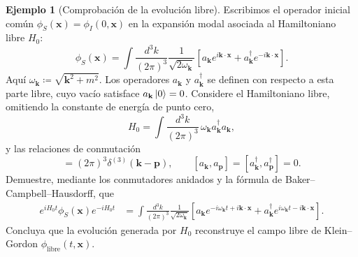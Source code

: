 \documentclass[11pt,letterpaper]{article}
\theoremstyle{definition}
\theoremstyle{definition}
\newtheorem{ejemplo}{Ejemplo}
\begin{document}
\begin{ejemplo}[Comprobación de la evolución libre]
Escribimos el operador inicial común $\phi_S(\mathbf{x})=\phi_I(0,\mathbf{x})$
en la expansión modal asociada al Hamiltoniano libre $H_0$:
\begin{equation}
  \phi_S(\mathbf{x})=
  \int\frac{d^3k}{(2\pi)^3}\frac{1}{\sqrt{2\omega_{\mathbf{k}}}}
  \left[
    a_{\mathbf{k}}e^{i\mathbf{k}\cdot\mathbf{x}}
    +a_{\mathbf{k}}^\dagger e^{-i\mathbf{k}\cdot\mathbf{x}}
  \right].
  \label{eq:freefield0}
\end{equation}
Aquí $\omega_{\mathbf{k}}\coloneqq\sqrt{\mathbf{k}^2+m^2}$.
Los operadores $a_{\mathbf{k}}$ y $a_{\mathbf{k}}^\dagger$ se definen con
respecto a esta parte libre, cuyo vacío satisface $a_{\mathbf{k}}\ket{0}=0$.
Considere el Hamiltoniano libre, omitiendo la constante de energía de punto cero,
\begin{equation}
  H_0=\int\frac{d^3k}{(2\pi)^3}\,
  \omega_{\mathbf{k}}a_{\mathbf{k}}^\dagger a_{\mathbf{k}},
\end{equation}
y las relaciones de conmutación
\begin{equation}
  [a_{\mathbf{k}},a_{\mathbf{p}}^\dagger]
  =(2\pi)^3\delta^{(3)}(\mathbf{k}-\mathbf{p}),
  \qquad
  [a_{\mathbf{k}},a_{\mathbf{p}}]
  =[a_{\mathbf{k}}^\dagger,a_{\mathbf{p}}^\dagger]=0.
\end{equation}
Demuestre, mediante los conmutadores anidados y la fórmula de
Baker--Campbell--Hausdorff, que
\begin{equation}
  \boxed{\begin{aligned}
  e^{iH_0t}\phi_S(\mathbf{x})e^{-iH_0t}
  &={}\int\frac{d^3k}{(2\pi)^3}\frac{1}{\sqrt{2\omega_{\mathbf{k}}}}
  \left[
    a_{\mathbf{k}}e^{-i\omega_{\mathbf{k}}t+i\mathbf{k}\cdot\mathbf{x}}
    +a_{\mathbf{k}}^\dagger e^{i\omega_{\mathbf{k}}t-i\mathbf{k}\cdot\mathbf{x}}
  \right].
  \end{aligned}}
  \label{eq:freefield}
\end{equation}
Concluya que la evolución generada por $H_0$ reconstruye el campo libre de
Klein--Gordon $\phi_{\mathrm{libre}}(t,\mathbf{x})$.


\end{ejemplo}
\end{document}
